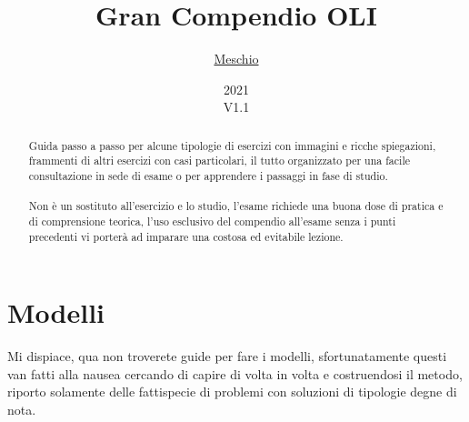 \documentclass{article}
\title{Gran Compendio OLI}
\author{\href{https://github.com/meschio94/Gran-Compendio-OLI}{Meschio}}
\date{2021\\V1.1}
\begin{document}
\maketitle

\begin{abstract}
Guida passo a passo per alcune tipologie di esercizi con immagini e ricche spiegazioni, frammenti di altri esercizi con casi particolari, il tutto organizzato per una facile consultazione in sede di esame o per apprendere i passaggi in fase di studio.\\
\\
Non è un sostituto all'esercizio e lo studio, l'esame richiede una buona dose di pratica e di comprensione teorica, l'uso esclusivo del compendio all'esame senza i punti precedenti vi porterà ad imparare una costosa ed evitabile lezione.
\end{abstract}

\tableofcontents

\section{Modelli}
Mi dispiace, qua non troverete guide per fare i modelli, sfortunatamente questi van fatti alla nausea cercando di capire di volta in volta e costruendosi il metodo, riporto solamente delle fattispecie di problemi con soluzioni di tipologie degne di nota.
\end{document}
